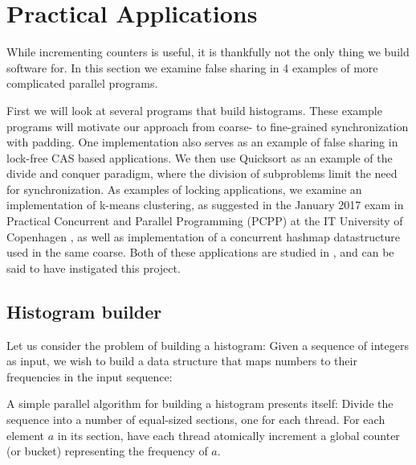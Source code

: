 


\section{Practical Applications}
While incrementing counters is useful, it is thankfully not the only thing we
build software for.
In this section we examine false sharing in 4  examples of more complicated parallel programs.

First we will look at several programs that build histograms. These example
programs will motivate our approach from coarse- to fine-grained synchronization
with padding. One implementation also serves as an example of false sharing in
lock-free CAS based applications. We then use Quicksort as an example of the
divide and conquer paradigm, where the division of subproblems limit the need
for synchronization.
As examples of locking applications, we examine an implementation of k-means
clustering, as suggested in the January 2017 exam in Practical Concurrent and
Parallel Programming (PCPP) at the IT University of Copenhagen \cite{kmeansexam,
kmeansexamcode}, as well as implementation of a concurrent hashmap datastructure
used in the same coarse. Both of these applications are studied in
\cite{mystery}, and can be said to have instigated this project.

\subsection{Histogram builder}

Let us consider the problem of building a histogram: Given a sequence of
integers as input, we wish to build a data structure that maps numbers to their
frequencies in the input sequence:

A simple parallel algorithm for building a histogram presents itself: Divide the
sequence into a number of equal-sized sections, one for each thread. For each
element $a$ in its section, have each thread atomically increment a global
counter (or bucket) representing the frequency of $a$.

